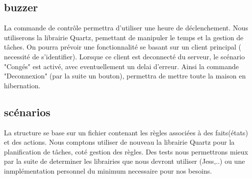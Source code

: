 \documentclass[12pt,a4paper]{article}
\begin{document}
  \subsection*{buzzer}
    La commande de contrôle permettra d'utiliser une heure de déclenchement. Nous utiliserons la librairie Quartz, pemettant de manipuler le temps et la gestion de tâches.
    On pourra prévoir une fonctionnalité se basant sur un client principal ( necessité de s'identifier). Lorsque ce client est deconnecté
    du serveur, le scénario "Congés" est activé, avec eventuellement un delai d'erreur.
    Ainsi la commande "Deconnexion" (par la suite un bouton), permettra de mettre toute la maison en hibernation.
  \subsection*{scénarios}
    La structure se base sur un fichier contenant les règles associées à des faits(états) et des actions.
    Nous comptons utiliser de nouveau la librairie Quartz pour la planification de tâches, coté gestion des règles.
    Des tests nous permettrons mieux par la suite de determiner les librairies que nous devront utiliser (Jess,..) ou une inmplémentation
    personnel du minimum necessaire pour nos besoins.
\end{document}

